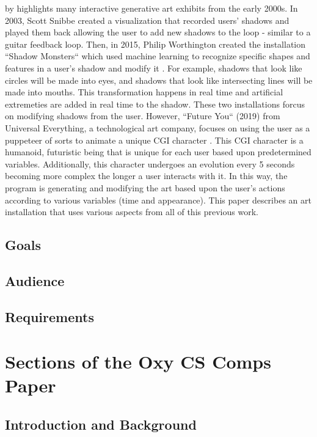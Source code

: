 \documentclass[10pt,twocolumn]{article}
\begin{document}
 by \citeauthor{kwon_real-time_nodate} highlights many interactive generative art exhibits from the early 2000s. In 2003, Scott Snibbe created a visualization that recorded users' shadows and played them back allowing the user to add new shadows to the loop - similar to a guitar feedback loop.  Then, in 2015, Philip Worthington created the installation ``Shadow Monsters`` which used machine learning to recognize specific shapes and features in a user's shadow and modify it \cite{houston_public_media_mfah_2015}.  For example, shadows that look like circles will be made into eyes, and shadows that look like intersecting lines will be made into mouths.  This transformation happens in real time and artificial extremeties are added in real time to the shadow. These two installations forcus on modifying shadows from the user. However, ``Future You`` (2019) from Universal Everything, a technological art company, focuses on using the user as a puppeteer of sorts to animate a unique CGI character \cite{noauthor_future_2019}. This CGI character is a humanoid, futuristic being that is unique for each user based upon predetermined variables. Additionally, this character undergoes an evolution every 5 seconds becoming more complex the longer a user interacts with it.  In this way, the program is generating and modifying the art based upon the user's actions according to various variables (time and appearance).  This paper describes an art installation that uses various aspects from all of this previous work. 

\subsection{Goals}

\subsection{Audience}

\subsection{Requirements}

\section{Sections of the Oxy CS Comps Paper}

\subsection{Introduction and Background}
\end{document}
